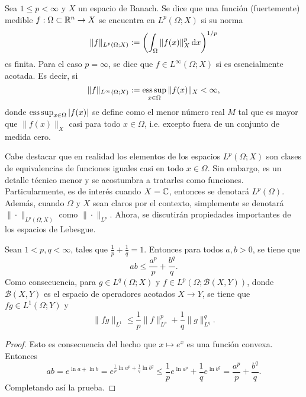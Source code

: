 \begin{definition}
    Sea $1\leq p < \infty$ y $X$ un espacio de Banach. Se dice que una función (fuertemente) medible $f:\Omega\subset\mathbb{R}^n\rightarrow X$ se encuentra en $L^p(\Omega;X)$ si su norma 
    \begin{equation*}
        \|f\|_{L^p(\Omega;X)} := \left( \int_\Omega \|f(x)\|_X^p \mathop{}\!\mathrm{d} x
        \right)^{1/p}
    \end{equation*}
    es finita. Para el caso $p=\infty$, se dice que $f\in L^\infty(\Omega;X)$
    si es esencialmente acotada. Es decir, si
    \begin{equation*}
        \|f\|_{L^\infty(\Omega;X)} := \operatorname*{ess\,sup}_{x\in\Omega}\|f(x)\|_X < \infty,
    \end{equation*}
    donde $\operatorname*{ess\,sup}_{x\in\Omega}|f(x)|$ se define como el menor número real $M$
    tal que es mayor que $\|f(x)\|_X$ casi para todo $x\in\Omega$, i.e. excepto fuera de
    un conjunto de medida cero.
\end{definition}
Cabe destacar que en realidad los elementos de los espacios $L^p(\Omega;X)$
son clases de equivalencias de funciones iguales casi en todo $x\in\Omega$.
Sin embargo, es un detalle técnico menor y se acostumbra a tratarles como funciones. Particularmente, es de interés cuando $X=\mathbb{C}$, entonces se denotará $L^p(\Omega)$. Además, cuando $\Omega$ y $X$ sean claros por el contexto, simplemente se denotará
$\|\cdot\|_{L^p(\Omega;X)}$ como $\|\cdot\|_{L^p}$. Ahora, se discutirán propiedades 
importantes de los espacios de Lebesgue.
\begin{proposition}
    Sean $1< p, q< \infty$, tales que $\frac{1}{p} + \frac{1}{q} = 1$.
    Entonces para todos $a, b > 0$, se tiene que 
    \begin{equation*}
        ab \leq \frac{a^p}{p} + \frac{b^q}{q}.
    \end{equation*}
    Como consecuencia, para $g\in L^q(\Omega;X)$ y $f\in L^p(\Omega;\mathcal{B}(X, Y))$, donde $\mathcal{B}(X, Y)$ es el espacio de operadores acotados $X\to Y$, 
    se tiene que $fg \in L^1(\Omega;Y)$ y 
    \begin{equation*}
        \|fg\|_{L^1} \leq \frac{1}{p}\|f\|^p_{L^p} + \frac{1}{q}
        \|g\|_{L^q}^q.
    \end{equation*}
\end{proposition}
\begin{proof}
    Esto es consecuencia del hecho que $x\mapsto e^x$ es una función
    convexa. Entonces
    \begin{equation*}
        ab = e^{\ln a + \ln b} = e^{\frac{1}{p}\ln a^p + 
        \frac{1}{q}\ln b^q} \leq \frac{1}{p}e^{\ln a^p} +
        \frac{1}{q}e^{\ln b^q} = \frac{a^p}{p} + \frac{b^q}{q}.
    \end{equation*}
    Completando así la prueba.
\end{proof}
